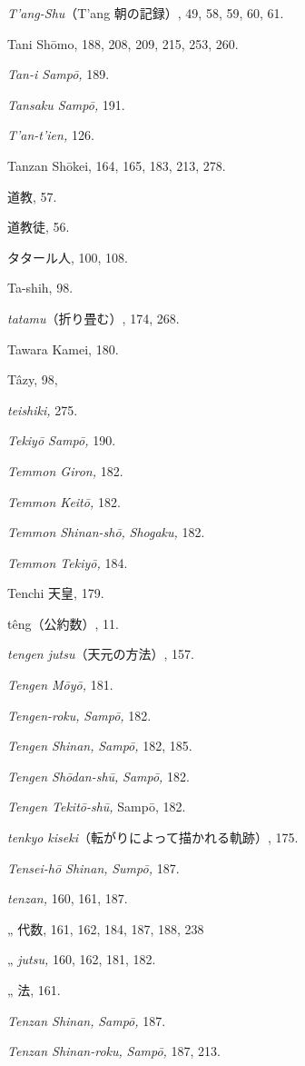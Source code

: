 \documentclass[11pt]{article}
\begin{document}
\emph{T'ang-Shu}（T'ang 朝の記録）, 49, 58, 59, 60, 61.\par
Tani Shōmo, 188, 208, 209, 215, 253, 260.\par
\emph{Tan-i Sampō,} 189.\par
\emph{Tansaku Sampō,} 191.\par
\emph{T'an-t'ien,} 126.\par
Tanzan Shōkei, 164, 165, 183, 213, 278.\par
道教, 57.\par
道教徒, 56.\par
タタール人, 100, 108.\par
Ta-shih, 98.\par
\emph{tatamu}（折り畳む）, 174, 268.\par
Tawara Kamei, 180.\par
Tâzy, 98,\par
\emph{teishiki,} 275.\par
\emph{Tekiyō Sampō,} 190.\par
\emph{Temmon Giron,} 182.\par
\emph{Temmon Keitō,} 182.\par
\emph{Temmon Shinan-shō,} \emph{Shogaku,} 182.\par
\emph{Temmon Tekiyō,} 184.\par
Tenchi 天皇, 179.\par
têng（公約数）, 11.\par
\emph{tengen jutsu}（天元の方法）, 157.\par
\emph{Tengen Mōyō,} 181.\par
\emph{Tengen-roku,} \emph{Sampō,} 182.\par
\emph{Tengen Shinan,} \emph{Sampō,} 182, 185.\par
\emph{Tengen Shōdan-shū,} \emph{Sampō,} 182.\par
\emph{Tengen Tekitō-shū,} Sampō, 182.\par
\emph{tenkyo kiseki}（転がりによって描かれる軌跡）, 175.\par
\emph{Tensei-hō Shinan,} \emph{Sumpō,} 187.\par
\emph{tenzan,} 160, 161, 187.\par
\quad „ 代数, 161, 162, 184, 187, 188, 238\par
\quad „ \emph{jutsu,} 160, 162, 181, 182.\par
\quad „ 法, 161.\par
\emph{Tenzan Shinan,} \emph{Sampō,} 187.\par
\emph{Tenzan Shinan-roku,} \emph{Sampō,} 187, 213.\par
\end{document}
